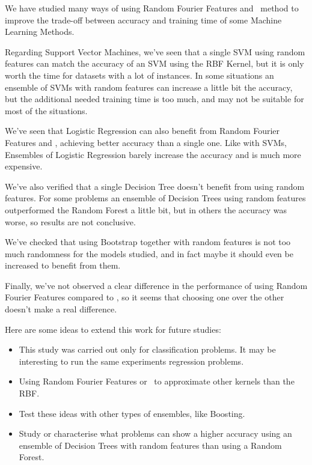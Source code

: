 \begin{pre-delivery}
  We have studied many ways of using Random Fourier Features and \Nys\ method
  to improve the trade-off between accuracy and training time of some
  Machine Learning Methods.

  Regarding Support Vector Machines, we've seen that a single SVM using
  random features can match the accuracy of an SVM using the RBF Kernel, but
  it is only worth the time for datasets with a lot of instances. In some
  situations an ensemble of SVMs with random features can increase a little
  bit the accuracy, but the additional needed training time is too much, and
  may not be suitable for most of the situations.

  We've seen that Logistic Regression can also benefit from Random Fourier
  Features and \Nys, achieving better accuracy than a single one. Like with
  SVMs, Ensembles of Logistic Regression barely increase the accuracy and
  is much more expensive.

  We've also verified that a single Decision Tree doesn't benefit from using
  random features. For some problems an ensemble of Decision Trees using
  random features outperformed the Random Forest a little bit, but in others
  the accuracy was worse, so results are not conclusive.

  We've checked that using Bootstrap together with random features is not
  too much randomness for the models studied, and in fact maybe it should
  even be increased to benefit from them.

  Finally, we've not observed a clear difference in the performance of using
  Random Fourier Features compared to \Nys, so it seems that choosing one over
  the other doesn't make a real difference.

  Here are some ideas to extend this work for future studies:
  \begin{itemize}
    \item This study was carried out only for classification problems. It may be
    interesting to run the same experiments regression problems.
    \item Using Random Fourier Features or \Nys\ to approximate other kernels
    than the RBF.
    \item Test these ideas with other types of ensembles, like Boosting.
    \item Study or characterise what problems can show a higher accuracy
    using an ensemble of Decision Trees with random features than
    using a Random Forest.
  \end{itemize}
\end{pre-delivery}
